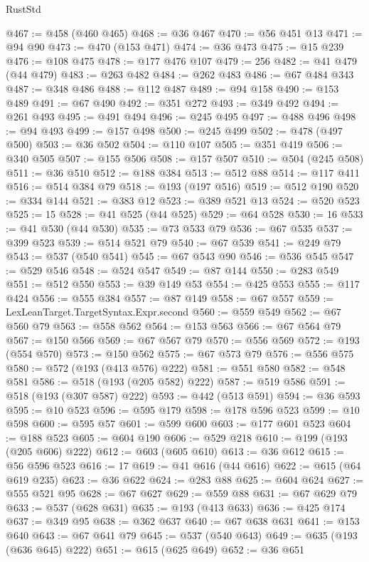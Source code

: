 \begin{lexlean}{RustStd}
\begin{coremodule}
@467 := @458 (@460 @465)
@468 := @36 @467
@470 := @56 @451 @13
@471 := @94 @90
@473 := @470 (@153 @471)
@474 := @36 @473
@475 := @15 @239
@476 := @108 @475
@478 := @177 @476 @107
@479 := 256
@482 := @41 @479 (@44 @479)
@483 := @263 @482
@484 := @262 @483
@486 := @67 @484 @343
@487 := @348 @486
@488 := @112 @487
@489 := @94 @158
@490 := @153 @489
@491 := @67 @490
@492 := @351 @272
@493 := @349 @492
@494 := @261 @493
@495 := @491 @494
@496 := @245 @495
@497 := @488 @496
@498 := @94 @493
@499 := @157 @498
@500 := @245 @499
@502 := @478 (@497 @500)
@503 := @36 @502
@504 := @110 @107
@505 := @351 @419
@506 := @340 @505
@507 := @155 @506
@508 := @157 @507
@510 := @504 (@245 @508)
@511 := @36 @510
@512 := @188 @384
@513 := @512 @88
@514 := @117 @411
@516 := @514 @384 @79
@518 := @193 (@197 @516)
@519 := @512 @190
@520 := @334 @144
@521 := @383 @12
@523 := @389 @521 @13
@524 := @520 @523
@525 := 15
@528 := @41 @525 (@44 @525)
@529 := @64 @528
@530 := 16
@533 := @41 @530 (@44 @530)
@535 := @73 @533 @79
@536 := @67 @535
@537 := @399 @523
@539 := @514 @521 @79
@540 := @67 @539
@541 := @249 @79
@543 := @537 (@540 @541)
@545 := @67 @543 @90
@546 := @536 @545
@547 := @529 @546
@548 := @524 @547
@549 := @87 @144
@550 := @283 @549
@551 := @512 @550
@553 := @39 @149 @53
@554 := @425 @553
@555 := @117 @424
@556 := @555 @384
@557 := @87 @149
@558 := @67 @557
@559 := LexLeanTarget.TargetSyntax.Expr.second
@560 := @559 @549
@562 := @67 @560 @79
@563 := @558 @562
@564 := @153 @563
@566 := @67 @564 @79
@567 := @150 @566
@569 := @67 @567 @79
@570 := @556 @569
@572 := @193 (@554 @570)
@573 := @150 @562
@575 := @67 @573 @79
@576 := @556 @575
@580 := @572 (@193 (@413 @576) @222)
@581 := @551 @580
@582 := @548 @581
@586 := @518 (@193 (@205 @582) @222)
@587 := @519 @586
@591 := @518 (@193 (@307 @587) @222)
@593 := @442 (@513 @591)
@594 := @36 @593
@595 := @10 @523
@596 := @595 @179
@598 := @178 @596 @523
@599 := @10 @598
@600 := @595 @57
@601 := @599 @600
@603 := @177 @601 @523
@604 := @188 @523
@605 := @604 @190
@606 := @529 @218
@610 := @199 (@193 (@205 @606) @222)
@612 := @603 (@605 @610)
@613 := @36 @612
@615 := @56 @596 @523
@616 := 17
@619 := @41 @616 (@44 @616)
@622 := @615 (@64 @619 @235)
@623 := @36 @622
@624 := @283 @88
@625 := @604 @624
@627 := @555 @521 @95
@628 := @67 @627
@629 := @559 @88
@631 := @67 @629 @79
@633 := @537 (@628 @631)
@635 := @193 (@413 @633)
@636 := @425 @174
@637 := @349 @95
@638 := @362 @637
@640 := @67 @638 @631
@641 := @153 @640
@643 := @67 @641 @79
@645 := @537 (@540 @643)
@649 := @635 (@193 (@636 @645) @222)
@651 := @615 (@625 @649)
@652 := @36 @651

\end{coremodule}
\end{lexlean}
